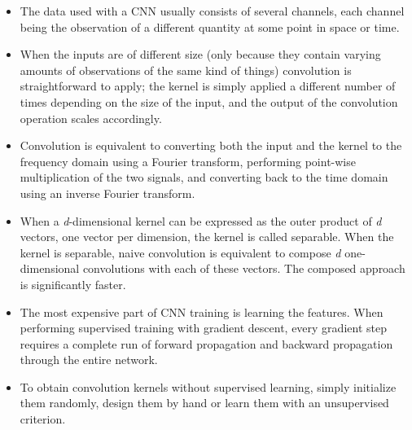 \documentclass{article}
\begin{document}
\begin{itemize}
\item The data used with a CNN usually consists of several channels, each channel being the observation of a different quantity at some point in space or time.
\item When the inputs are of different size (only because they contain varying amounts of observations of the same kind of things) convolution is straightforward to apply; the kernel is simply applied a different number of times depending on the size of the input, and the output of the convolution operation scales accordingly.
\item Convolution is equivalent to converting both the input and the kernel to the frequency domain using a Fourier transform, performing point-wise multiplication of the two signals, and converting back to the time domain using an inverse Fourier transform.
\item When a \textit{d}-dimensional kernel can be expressed as the outer product of \textit{d} vectors, one vector per dimension, the kernel is called separable. When the kernel is separable, naive convolution is equivalent to compose \textit{d} one-dimensional convolutions with each of these vectors. The composed approach is significantly faster.
\item The most expensive part of CNN training is learning the features. When performing supervised training with gradient descent, every gradient step requires a complete run of forward propagation and backward propagation through the entire network.
\item To obtain convolution kernels without supervised learning, simply initialize them randomly, design them by hand or learn them with an unsupervised criterion.
\end{itemize}
\end{document}
